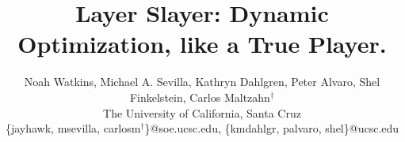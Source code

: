 \documentclass[letterpaper,twocolumn,10pt]{article}
\begin{document}

\title{Layer Slayer: Dynamic Optimization, like a True Player.}

\author{
{\rm Noah Watkins, Michael A. Sevilla, Kathryn Dahlgren, Peter Alvaro, Shel Finkelstein, Carlos Maltzahn$^{\dag}$}\\
The University of California, Santa Cruz\\
\{jayhawk, msevilla, carlosm$^{\dag}$\}@soe.ucsc.edu, \{kmdahlgr, palvaro, shel\}@ucsc.edu
} %

\maketitle











{\footnotesize 
}
\end{document}
